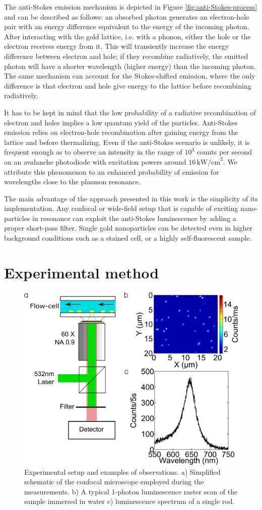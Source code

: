 \documentclass[journal=nalefd,manuscript=letter]{achemso}
\newcommand{\pwr}{\ensuremath{\,\textrm{kW/cm}^2}}
\begin{document}
The anti-Stokes emission mechanism is depicted in Figure
\ref{fig:anti-Stokes-process} and can be described as follows: an absorbed
photon generates an electron-hole pair with an energy difference equivalent to
the energy of the incoming photon. After interacting with the gold lattice, i.e.
with a phonon, either the hole or the electron receives energy from it. This
will transiently increase the energy difference between electron and hole; if
they recombine radiatively, the emitted photon will have a shorter wavelength
(higher energy) than the incoming photon. The same mechanism can account for the
Stokes-shifted emission, where the only difference is that electron and hole
give energy to the lattice before recombining radiatively.

It has to be kept in mind that the low probability of a radiative recombination
of electron and holes implies a low quantum yield of the particles. Anti-Stokes
emission relies on electron-hole recombination after gaining energy from the
lattice and before thermalizing. Even if the anti-Stokes scenario is unlikely,
it is frequent enough as to observe an intensity in the range of $10^3$ counts
per second on an avalanche photodiode with excitation powers around $16\pwr$. We
attribute this phenomenon to an enhanced probability of emission for wavelengths
close to the plasmon resonance.

The main advantage of the approach presented in this work is the simplicity of
its implementation. Any confocal or wide-field setup that is capable of exciting
nano-particles in resonance can exploit the anti-Stokes luminescence by adding a
proper short-pass filter. Single gold nanoparticles can be detected even in
higher background conditions such as a stained cell, or a highly
self-fluorescent sample.

\section{Experimental method}

\begin{figure}[htp]
 \centering \includegraphics[width=0.45\linewidth]{Figures/01_Setup/setup_1.png}
 \caption{Experimental setup and examples of observations. a) Simplified
 schematic of the confocal microscope employed during the measurements. b) A
 typical 1-photon luminescence raster scan of the sample immersed in
 water c) luminescence spectrum of a single rod.}
 \label{fig:setup}
\end{figure}
\end{document}
